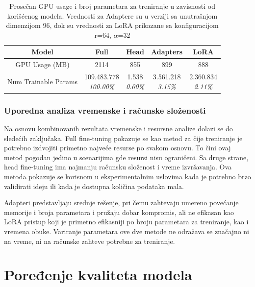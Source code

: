 \documentclass[12pt,oneside]{memoir}
\begin{document}
\begin{table}[h!]
	\centering
	\setlength{\tabcolsep}{12pt}
	\renewcommand{\arraystretch}{3}
	\begin{tabular}{|c|c|c|c|c|} 
		\hline
		Model & Full & Head & Adapters & LoRA \\
		\hline
		GPU Usage (MB) & 2114 & 855 & 899 & 888  \\ 
		\hline
		Num Trainable Params & \makecell{109.483.778 \\ \textit{100.00\%}} & \makecell{1.538 \\ \textit{0.00\%}} & \makecell{3.561.218 \\ \textit{3.15\%}} & \makecell{2.360.834 \\ \textit{2.11\%}} \\ 
		\hline
	\end{tabular}
	\caption{Prosečan GPU usage i broj parametara za treniranje u zavisnosti od korišćenog modela. Vrednosti za Adaptere su u verziji sa unutrašnjom dimenzijom 96, dok su vrednosti za LoRA prikazane sa konfiguracijom r=64, \(\alpha\)=32 }
	\label{tab:TrainingStatsUsage}
\end{table}

\subsubsection{Uporedna analiza vremenske i računske složenosti}
Na osnovu kombinovanih rezultata vremenske i resursne analize dolazi se do sledećih zaključaka. Full fine-tuning pokazuje se kao metod za čije treniranje je potrebno izdvojiti primetno najveće resurse po svakom osnovu. To čini ovaj metod pogodan jedino u scenarijima gde resursi nisu ograničeni. Sa druge strane, head fine-tuning ima najmanju računsku složenost i vreme izvršavanja. Ova metoda pokazuje se korisnom u eksperimentalnim uslovima kada je potrebno brzo validirati ideju ili kada je dostupna količina podataka mala. 

Adapteri predstavljaju srednje rešenje, pri čemu zahtevaju umereno povećanje memorije i broja parametara i pružaju dobar kompromis, ali ne efikasan kao LoRA pristup koji je primetno efikasniji po broju parametara za treniranje, kao i vremena obuke. Variranje parametara ove dve metode ne odražava se značajno ni na vreme, ni na računske zahteve potrebne za treniranje.

\section{Poređenje kvaliteta modela}
\end{document}

